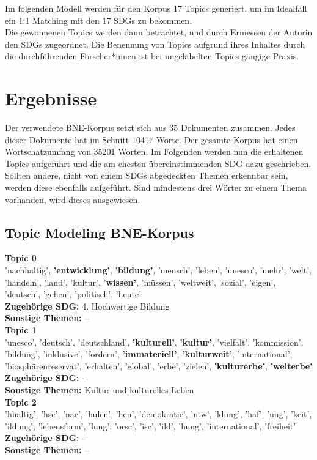 \documentclass[letterpaper]{article}
\begin{document}
Im folgenden Modell werden für den Korpus 17 Topics generiert, um im Idealfall ein 1:1 Matching mit den 17 SDGs zu bekommen.\\
Die gewonnenen Topics werden dann betrachtet, und durch Ermessen der Autorin den SDGs zugeordnet. Die Benennung von Topics aufgrund ihres Inhaltes durch die durchführenden Forscher*innen ist bei ungelabelten Topics gängige Praxis\cite{Ramage}.
\clearpage

\section{Ergebnisse}
Der verwendete BNE-Korpus setzt sich aus 35 Dokumenten zusammen. Jedes dieser Dokumente hat im Schnitt 10417 Worte. Der gesamte Korpus hat einen Wortschatzumfang von 35201 Worten. Im Folgenden werden nun die erhaltenen Topics aufgeführt und die am ehesten übereinstimmenden SDG dazu geschrieben. Sollten andere, nicht von einem SDGs abgedeckten Themen erkennbar sein, werden diese ebenfalls aufgeführt. Sind mindestens drei Wörter zu einem Thema vorhanden, wird dieses ausgewiesen. 

\subsection{Topic Modeling BNE-Korpus}

    \textbf{Topic 0} \\
'nachhaltig', \textbf{'entwicklung'}, \textbf{'bildung'}, 'mensch', 'leben', 'unesco', 'mehr', 'welt', 'handeln', 'land', 'kultur', '\textbf{wissen'}, 'müssen', 'weltweit', 'sozial', 'eigen', 'deutsch', 'gehen', 'politisch', 'heute' \\
\textbf{Zugehörige SDG:} 4. Hochwertige Bildung \\
\textbf{Sonstige Themen:} --\\

\textbf{Topic 1} \\
'unesco', 'deutsch', 'deutschland', \textbf{'kulturell'}, \textbf{'kultur'}, 'vielfalt', 'kommission', 'bildung', 'inklusive', 'fördern', \textbf{'immateriell'}, \textbf{'kulturweit'}, 'international', 'biosphärenreservat', 'erhalten', 'global', 'erbe', 'zielen', \textbf{'kulturerbe'}, \textbf{'welterbe'} \\
\textbf{Zugehörige SDG:} - \\
\textbf{Sonstige Themen:} Kultur und kulturelles Leben\\

\textbf{Topic 2}  \\
'hhaltig', 'hsc', 'nac', 'hulen', 'hen', 'demokratie', 'ntw', 'klung', 'haf', 'ung', 'keit', 'ildung', 'lebensform', 'lung', 'orsc', 'isc', 'ild', 'hung', 'international', 'freiheit' \\
\textbf{Zugehörige SDG:} --\\
\textbf{Sonstige Themen:} --\\
\end{document}
